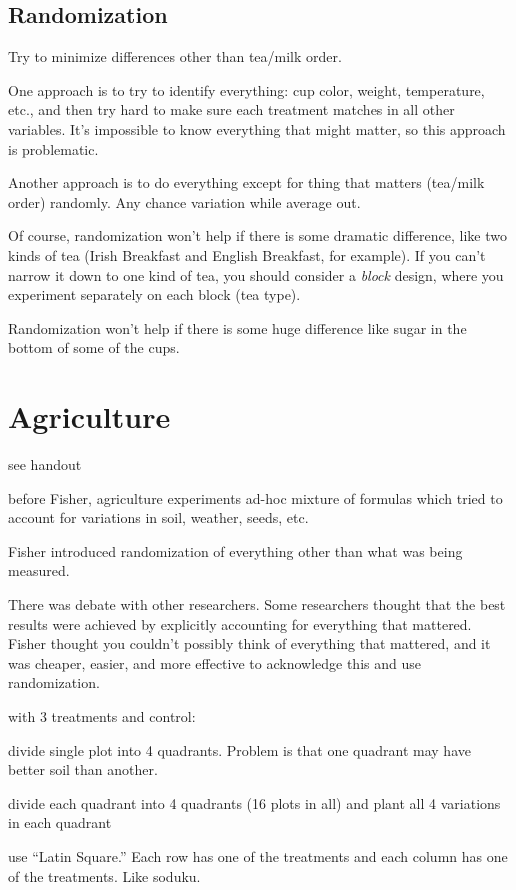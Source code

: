 \documentclass[landscape]{exam}
\begin{document}
  \subsection{Randomization}
  Try to minimize differences other than tea/milk order.

  One approach is to try to identify everything: cup color, weight, temperature,
  etc., and then try hard to make sure each treatment matches in all other
  variables.  It's impossible to know everything that might matter, so this
  approach is problematic.

  Another approach is to do everything except for thing that matters (tea/milk
  order) randomly.  Any chance variation while average out.

  Of course, randomization won't help if there is some dramatic difference, like
  two kinds of tea (Irish Breakfast and English Breakfast, for example).  If you
  can't narrow it down to one kind of tea, you should consider a {\em block\/}
  design, where you experiment separately on each block (tea type).

  Randomization won't help if there is some huge difference like sugar in the
  bottom of some of the cups.

  \section{Agriculture}
  \begin{itemize*}
    \item see handout

    \item before Fisher, agriculture experiments ad-hoc mixture of formulas
      which tried to account for variations in soil, weather, seeds, etc.

    \item Fisher introduced randomization of everything other than what was
      being measured.

    \item There was debate with other researchers.  Some
      researchers thought that the best results were achieved by explicitly
      accounting for everything that mattered.  Fisher thought you couldn't
      possibly think of everything that mattered, and it was cheaper, easier,
      and more effective to acknowledge this and use randomization.

    \item with 3 treatments and control:
      \begin{enumerate*}
        \item divide single plot into 4 quadrants.  Problem is that one quadrant
          may have better soil than another.
        \item divide each quadrant into 4 quadrants (16 plots in all) and plant
          all 4 variations in each quadrant
        \item use ``Latin Square.'' Each row has one of the treatments and each
          column has one of the treatments.  Like soduku.
      \end{enumerate*}
  \end{itemize*}
\end{document}

